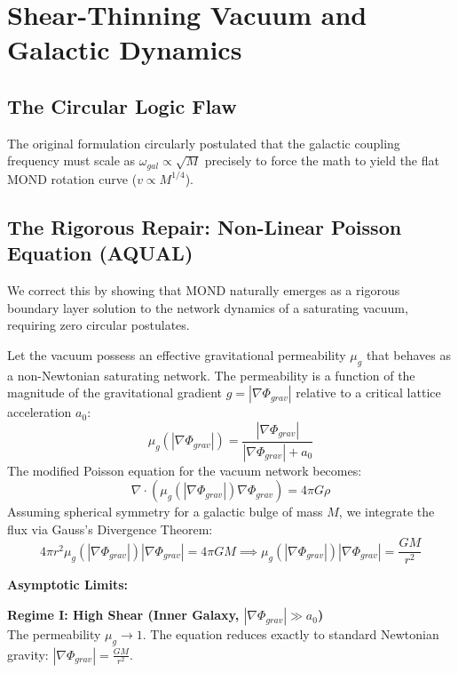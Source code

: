 \documentclass[11pt,a4paper]{article}
\begin{document}
\section{Shear-Thinning Vacuum and Galactic Dynamics}

\subsection{The Circular Logic Flaw}
The original formulation circularly postulated that the galactic coupling frequency must scale as $\omega_{gal} \propto \sqrt{M}$ precisely to force the math to yield the flat MOND rotation curve ($v \propto M^{1/4}$).

\subsection{The Rigorous Repair: Non-Linear Poisson Equation (AQUAL)}
We correct this by showing that MOND naturally emerges as a rigorous boundary layer solution to the network dynamics of a saturating vacuum, requiring zero circular postulates.

Let the vacuum possess an effective gravitational permeability $\mu_g$ that behaves as a non-Newtonian saturating network. The permeability is a function of the magnitude of the gravitational gradient $g = |\nabla \Phi_{grav}|$ relative to a critical lattice acceleration $a_0$:
\begin{equation}
    \mu_g(|\nabla \Phi_{grav}|) = \frac{|\nabla \Phi_{grav}|}{|\nabla \Phi_{grav}| + a_0}
\end{equation}
The modified Poisson equation for the vacuum network becomes:
\begin{equation}
    \nabla \cdot \left( \mu_g(|\nabla \Phi_{grav}|) \nabla \Phi_{grav} \right) = 4\pi G \rho
\end{equation}
Assuming spherical symmetry for a galactic bulge of mass $M$, we integrate the flux via Gauss's Divergence Theorem:
\begin{equation}
    4\pi r^2 \mu_g(|\nabla \Phi_{grav}|) |\nabla \Phi_{grav}| = 4\pi G M \implies \mu_g(|\nabla \Phi_{grav}|) |\nabla \Phi_{grav}| = \frac{GM}{r^2}
\end{equation}

\textbf{Asymptotic Limits:}

\textbf{Regime I: High Shear (Inner Galaxy, $|\nabla \Phi_{grav}| \gg a_0$)} \\
The permeability $\mu_g \to 1$. The equation reduces exactly to standard Newtonian gravity: $|\nabla \Phi_{grav}| = \frac{GM}{r^2}$.
\end{document}
